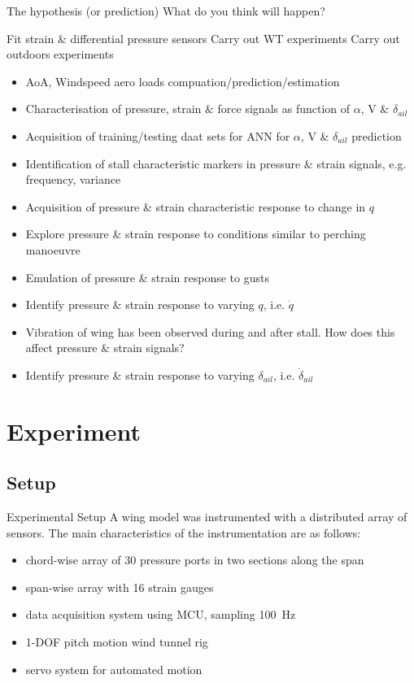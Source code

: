 \documentclass[aspectratio=169]{beamer}            %
\begin{document}
\begin{frame}{The hypothesis (or prediction)}
  What do you think will happen?
  
  Fit strain \& differential pressure sensors
  Carry out WT experiments
  Carry out outdoors experiments
  
  \begin{itemize}
    \item AoA, Windspeed aero loads compuation/prediction/estimation
    \item Characterisation of pressure, strain \& force signals as function of ${\alpha}$, V
      \& ${\delta_{ail}}$
    \item Acquisition of training/testing daat sets for ANN for ${\alpha}$, V \&
      ${\delta_{ail}}$ prediction
    \item Identification of stall characteristic markers in pressure \& strain signals, e.g.
      frequency, variance
    \item Acquisition of pressure \& strain characteristic response to change in ${q}$
    \item Explore pressure \& strain response to conditions similar to perching manoeuvre\
    \item Emulation of pressure \& strain response to gusts
    \item Identify pressure \& strain response to varying ${q}$, i.e. ${\dot{q}}$
    \item Vibration of wing has been observed during and after stall. How does this affect
      pressure \& strain signals?
    \item Identify pressure \& strain response to varying ${\delta_{ail}}$, i.e.
      ${\dot{\delta}_{ail}}$
  \end{itemize}
\end{frame}

\section{Experiment}
\subsection[Setup]{Setup}
\begin{frame}{Experimental Setup}
  A wing model was instrumented with a distributed array of sensors. The main characteristics of the instrumentation are as follows:
  \begin{itemize}
    \item{chord-wise array of 30 pressure ports in two sections along the span}
    \item{span-wise array with 16 strain gauges}
    \item{data acquisition system using MCU, sampling \@ \SI{100}{\hertz}}
    \item{1-DOF pitch motion wind tunnel rig}
    \item{servo system for automated motion}
  \end{itemize}
\end{frame}
\end{document}
